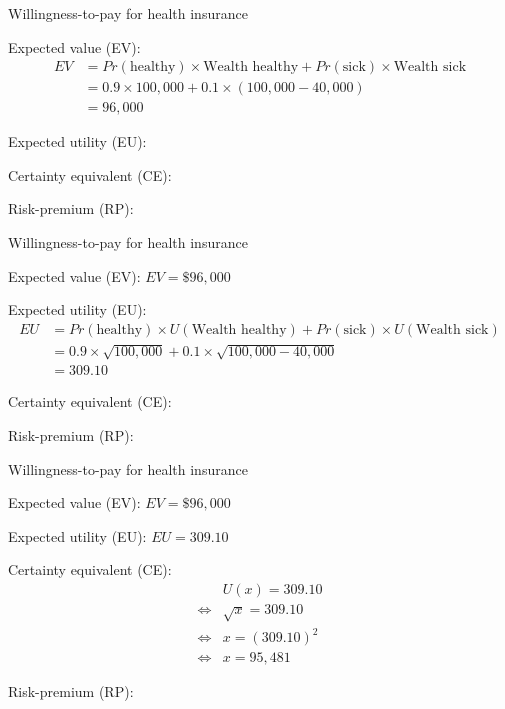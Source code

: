 \begin{frame}{Willingness-to-pay for health insurance}

    Expected value (EV):
    {\color{red}
    \begin{align*}
        EV &= Pr(\text{healthy}) \times \text{Wealth healthy} + Pr(\text{sick}) \times \text{Wealth sick}\\
        &= 0.9 \times 100,000 + 0.1 \times (100,000 - 40,000)\\
        &= 96,000
    \end{align*}
    }

    Expected utility (EU):
    \vspace{5mm}

    Certainty equivalent (CE):
    \vspace{5mm}

    Risk-premium (RP):

\end{frame}
\begin{frame}{Willingness-to-pay for health insurance}

    Expected value (EV): {\color{red}$EV =\$96,000$}
    \vspace{5mm}

    Expected utility (EU):
    {\color{red}
    \begin{align*}
        EU &= Pr(\text{healthy}) \times U(\text{Wealth healthy}) + Pr(\text{sick}) \times U(\text{Wealth sick})\\
        &= 0.9 \times \sqrt{100,000} + 0.1 \times \sqrt{100,000 - 40,000}\\
        &= 309.10
    \end{align*}
    }

    Certainty equivalent (CE):
    \vspace{5mm}

    Risk-premium (RP):

\end{frame}
\begin{frame}{Willingness-to-pay for health insurance}

    Expected value (EV): {\color{red}$EV =\$96,000$}
    \vspace{5mm}

    Expected utility (EU): {\color{red}$EU = 309.10$}
    \vspace{5mm}

    Certainty equivalent (CE):
    {\color{red}
    \begin{align*}
        &U(x) = 309.10\\
        \Leftrightarrow &\sqrt{x} = 309.10\\
        \Leftrightarrow &x = (309.10)^2\\
        \Leftrightarrow & x = 95,481
    \end{align*}
    }

    Risk-premium (RP):

\end{frame}
